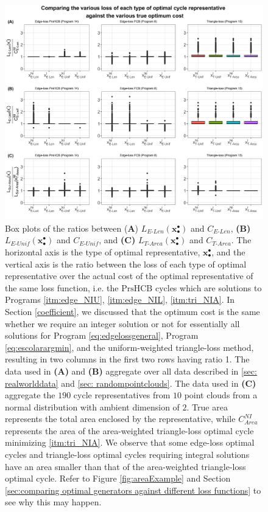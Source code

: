 \documentclass[utf8]{formatting_stuff/frontiersFPHY}
\newcommand{\optimalrep}{\mathbf{x}}
\newcommand{\se}{Section }
\newcommand{\NI}{^{NI}}
\newcommand{\setofpersistenthcyclebases}{\mathrm{PrsHCB}}
\newcommand{\pr}{Program }
\newcommand{\EU}{_{E\text{-}Unif}}
\newcommand{\EL}{_{E\text{-}Len}}
\newcommand{\TA}{_{T\text{-}Area}}
\theoremstyle{plain}
\theoremstyle{definition}
\begin{document}
\begin{figure}[h!]
\begin{center}
\includegraphics[width=\textwidth]{figures/length_area_edge.jpg}
\end{center}
\caption{Box plots of the ratios between (\textbf{A}) $L\EL(\optimalrep_\bullet^\bullet)$ and $C\EL$,  \textbf{(B)} $L\EU(\optimalrep_\bullet^\bullet)$ and $C\EU$, and  \textbf{(C)} $L\TA(\optimalrep_\bullet^\bullet)$ and $C\TA$. 
The horizontal axis is the type of optimal representative, $\optimalrep_\bullet^\bullet$, and the vertical axis is the ratio between the loss of each type of optimal representative over the actual cost of the optimal representative of the same loss function, i.e. the $\setofpersistenthcyclebases$ cycles which are solutions to Programs \ref{itm:edge_NIU}, \ref{itm:edge_NIL}, \ref{itm:tri_NIA}.
In \se \ref{coefficient}, we discussed that the optimum cost is the same whether we require an integer solution or not for essentially all solutions for \pr \eqref{eq:edgelossgeneral}, \pr \ref{eq:escolarargmin}, and the uniform-weighted triangle-loss method, resulting in two columns in the first two rows having ratio 1. The data used in \textbf{(A)} and \textbf{(B)} aggregate over all data described in \ref{sec: realworlddata} and \ref{sec: randompointclouds}. The data used in \textbf{(C)} aggregate the $190$ cycle representatives from $10$ point clouds from a normal distribution with ambient dimension of $2$. True area represents the total area enclosed by the representative, while $C_{Area}\NI$ represents the area of the area-weighted triangle-loss optimal cycle minimizing \ref{itm:tri_NIA}. We observe that some edge-loss optimal cycles and triangle-loss optimal cycles requiring integral solutions have an area smaller than that of the area-weighted triangle-loss optimal cycle. Refer to Figure \ref{fig:areaExample} and \se  \ref{sec:comparing optimal generators against different loss functions} to see why this may happen.  
}
 \label{fig:lengthcocmpare}
\end{figure}
\end{document}
